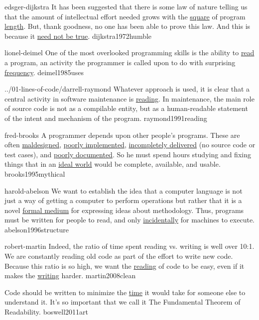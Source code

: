 \documentclass{article}
\begin{document}


\qte
  {edsger-dijkstra}
  {It has been suggested that there is some law of nature telling us that the amount of intellectual effort needed grows with the \ul{square} of program \ul{length}. But, thank goodness, no one has been able to prove this law. And this is because it \ul{need not be true}.}
  {dijkstra1972humble}

\qte
  {lionel-deimel}
  {One of the most overlooked programming skills is the ability to \ul{read} a program, an activity the programmer is called upon to do with surprising \ul{frequency}.}
  {deimel1985uses}

\qte
  {../01-lines-of-code/darrell-raymond}
  {Whatever approach is used, it is clear that a central activity in software maintenance is \ul{reading}. In maintenance, the main role of source code is not as a compilable entity, but as a human-readable statement of the intent and mechanism of the program.}
  {raymond1991reading}

\qte
  {fred-brooks}
  {A programmer depends upon other people's programs. These are often \ul{maldesigned}, \ul{poorly implemented}, \ul{incompletely delivered} (no source code or test cases), and \ul{poorly documented}. So he must spend hours studying and fixing things that in an \ul{ideal world} would be complete, available, and usable.}
  {brooks1995mythical}

\qte
  {harold-abelson}
  {We want to establish the idea that a computer language is not just a way of getting a computer to perform operations but rather that it is a novel \ul{formal medium} for expressing ideas about methodology. Thus, programs must be written for people to read, and only \ul{incidentally} for machines to execute.}
  {abelson1996structure}

\qte
  {robert-martin}
  {Indeed, the ratio of time spent reading vs. writing is well over 10:1. We are constantly reading old code as part of the effort to write new code. Because this ratio is so high, we want the \ul{reading} of code to be easy, even if it makes the \ul{writing} harder.}
  {martin2008clean}

  {Code should be written to minimize the \ul{time} it would take for someone else to understand it. It's so important that we call it The Fundamental Theorem of Readability.}
  {boswell2011art}
\end{document}
